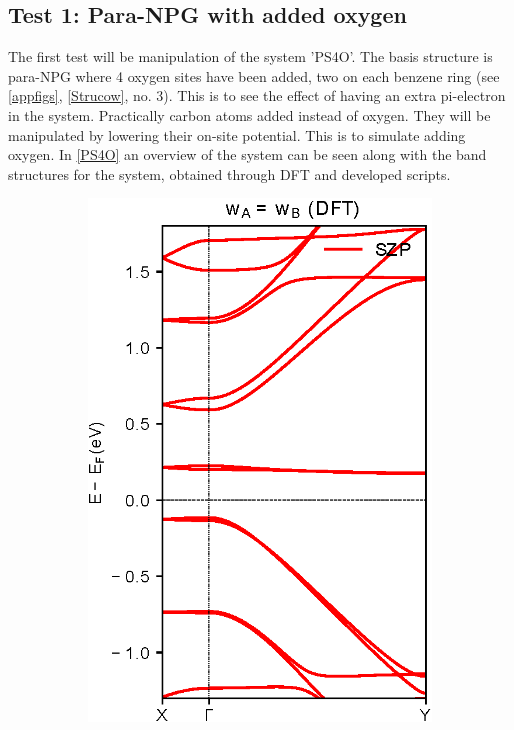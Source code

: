 \subsection{Test 1: Para-NPG with added oxygen}
The first test will be manipulation of the system 'PS4O'. The basis structure is para-NPG where 4 oxygen sites have been added, two on each benzene ring (see \cref{appfigs}, \cref{Strucow}, no. 3). This is to see the effect of having an extra pi-electron in the system. Practically carbon atoms added instead of oxygen. They will be manipulated by lowering their on-site potential. This is to simulate adding oxygen. In \cref{PS4O} an overview of the system can be seen along with the band structures for the system, obtained through DFT and developed scripts.
\begin{figure}[h]
	\centering
	\begin{subfigure}[b]{0.3\textwidth}
		\centering
		\includegraphics[width=\textwidth]{Figures/PS4ODFT.eps}

\end{subfigure}
\end{figure}
